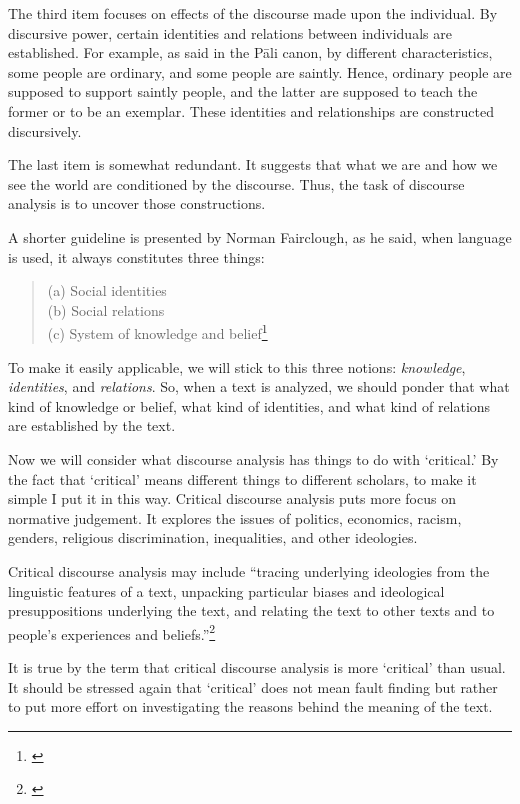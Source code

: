 The third item focuses on effects of the discourse made upon the individual. By discursive power, certain identities and relations between individuals are established. For example, as said in the P\=ali canon, by different characteristics, some people are ordinary, and some people are saintly. Hence, ordinary people are supposed to support saintly people, and the latter are supposed to teach the former or to be an exemplar. These identities and relationships are constructed discursively.

The last item is somewhat redundant. It suggests that what we are and how we see the world are conditioned by the discourse. Thus, the task of discourse analysis is to uncover those constructions.

A shorter guideline is presented by Norman Fairclough, as he said, when language is used, it always constitutes three things:

\begin{quote}
(a) Social identities\\
(b) Social relations\\
(c) System of knowledge and belief\footnote{\citealp[p.~134]{fairclough:marketization}} 
\end{quote}

To make it easily applicable, we will stick to this three notions: \emph{knowledge}, \emph{identities}, and \emph{relations}. So, when a text is analyzed, we should ponder that what kind of knowledge or belief, what kind of identities, and what kind of relations are established by the text.

Now we will consider what discourse analysis has things to do with `critical.' By the fact that `critical' means different things to different scholars, to make it simple I put it in this way. Critical discourse analysis puts more focus on normative judgement. It explores the issues of politics, economics, racism, genders, religious discrimination, inequalities, and other ideologies.

Critical discourse analysis may include ``tracing underlying ideologies from the linguistic features of a text, unpacking particular biases and ideological presuppositions underlying the text, and relating the text to other texts and to people's experiences and beliefs.''\footnote{\citealp[p.~186]{paltridge:discourse}}

It is true by the term that critical discourse analysis is more `critical' than usual. It should be stressed again that `critical' does not mean fault finding but rather to put more effort on investigating the reasons behind the meaning of the text.

